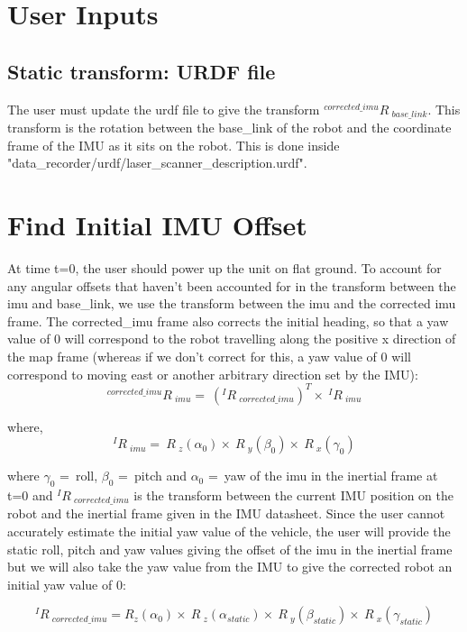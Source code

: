 \documentclass{article}
\begin{document}
\section{User Inputs}

\subsection{Static transform: URDF file}
The user must update the urdf file to give the transform $ {^{corrected\_imu}R\ _{base\_link}} $. This transform is the rotation between the base\_link of the robot and the coordinate frame of the IMU as it sits on the robot. This is done inside "data\_recorder/urdf/laser\_scanner\_description.urdf".

\section{Find Initial IMU Offset}
At time t=0, the user should power up the unit on flat ground. To account for any angular offsets that haven't been accounted for in the transform between the imu and base\_link, we use the transform between the imu and the corrected imu frame. The corrected\_imu frame also corrects the initial heading, so that a yaw value of 0 will correspond to the robot travelling along the positive x direction of the map frame (whereas if we don't correct for this, a yaw value of 0 will correspond to moving east or another arbitrary direction set by the IMU):
\begin{equation}
^{corrected\_imu}R\ _{imu} =\ (^{I}R\ _{corrected\_imu})^T \times\  ^{I}R\ _{imu}
\end{equation}

where,
\begin{equation}
^{I}R\ _{imu} =\ R\ _z(\alpha_0) \times\  R\ _y(\beta_0) \times\  R\ _x(\gamma_0) 
\end{equation}

where $\gamma_0$ =\ roll, $\beta_0$ =\ pitch and $\alpha_0$ =\ yaw of the imu in the inertial frame at t=0 and $^{I}R\ _{corrected\_imu} $ is the transform between the current IMU position on the robot and the inertial frame given in the IMU datasheet. Since the user cannot accurately estimate the initial yaw value of the vehicle, the user will provide the static roll, pitch and yaw values giving the offset of the imu in the inertial frame but we will also take the yaw value from the IMU to give the corrected robot an initial yaw value of 0:

\begin{equation}
^{I}R\ _{corrected\_imu} = R_z(\alpha_0) \times\ R\ _z(\alpha_{static}) \times\  R\ _y(\beta_{static}) \times\  R\ _x(\gamma_{static})
\end{equation}
\end{document}
